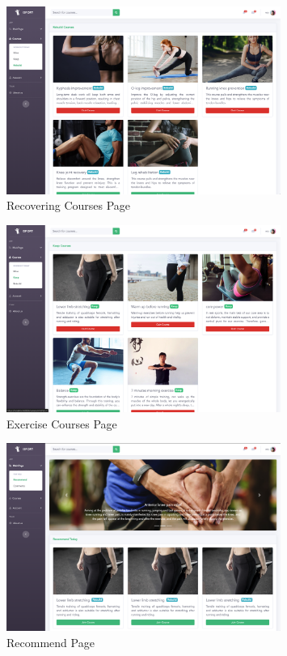 \documentclass[16pt]{scrreprt}
\begin{document}
\begin{figure}[H]
	\centering
	\includegraphics[width=0.8\textwidth]{diagrams/rebuild.png}
	\caption{Recovering Courses Page}
\end{figure}

\begin{figure}[H]
	\centering
	\includegraphics[width=0.8\textwidth]{diagrams/keep.png}
	\caption{Exercise Courses Page}
\end{figure}

\begin{figure}[H]
	\centering
	\includegraphics[width=0.8\textwidth]{diagrams/recommend.png}
	\caption{Recommend Page}
\end{figure}
\end{document}
